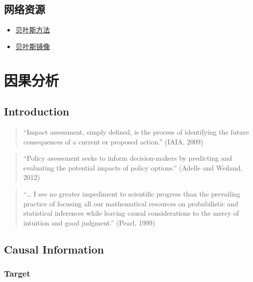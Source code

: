 \documentclass[
]{book}
\providecommand{\tightlist}{%
  \setlength{\itemsep}{0pt}\setlength{\parskip}{0pt}}
\begin{document}
\hypertarget{bayeslink}{%
\section{网络资源}\label{bayeslink}}

\begin{itemize}
\tightlist
\item
  \href{http://mindhacks.cn/2008/09/21/the-magical-bayesian-method/}{贝叶斯方法}
\item
  \href{https://github.com/mavelli/rocker-bayesian}{贝叶斯镜像}
\end{itemize}

\hypertarget{why}{%
\chapter{因果分析}\label{why}}

\hypertarget{introduction}{%
\section{Introduction}\label{introduction}}

\begin{quote}
``Impact assessment, simply defined, is the process of identifying the future consequences of a current or proposed action.'' (IAIA, 2009)
\end{quote}

\begin{quote}
``Policy assessment seeks to inform decision-makers by predicting and evaluating the potential impacts of policy options.'' (Adelle and Weiland, 2012)
\end{quote}

\begin{quote}
``\ldots{} I see no greater impediment to scientific progress than the prevailing practice of focusing all our mathematical resources on probabilistic and statistical inferences while leaving causal considerations to the mercy of intuition and good judgment.'' (Pearl, 1999)
\end{quote}

\hypertarget{causal-information}{%
\section{Causal Information}\label{causal-information}}

\hypertarget{target}{%
\subsection{Target}\label{target}}
\end{document}
